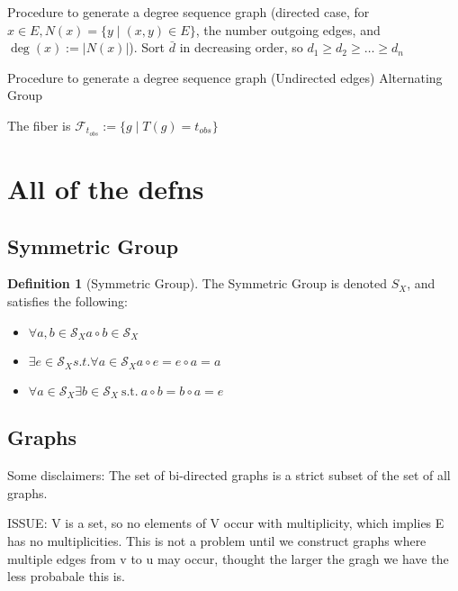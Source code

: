 \documentclass{article}
\theoremstyle{definition}
\newtheorem{definition}{Definition}
\begin{document}
Procedure to generate a degree sequence graph (directed case, for $x \in E, N(x) = \{y \mid (x,y) \in E\}$, the number outgoing edges, and $\deg(x) := |N(x)|$).
Sort $\bar{d}$ in decreasing order, so \( d_1 \geq d_2 \geq \dots \geq d_n \)

Procedure to generate a degree sequence graph (Undirected edges)
Alternating Group

The fiber is
\( \mathcal{F}_{t_{obs}} := \{ g \mid T(g) = t_{obs} \} \)


\section{All of the defns}

\subsection{Symmetric Group}
\begin{definition}[Symmetric Group] The Symmetric Group is denoted $S_X$, and satisfies the following:
\begin{itemize}
\item \( \forall a,b \in \mathcal{S}_X  a \circ b \in \mathcal{S}_X \)
\item \( \exists e \in \mathcal{S}_X s.t. \forall a \in \mathcal{S}_X a \circ e = e \circ a = a\)
\item \( \forall a \in \mathcal{S}_X \exists b \in \mathcal{S}_X \: \text{s.t.} \: a \circ b = b \circ a = e\)
\end{itemize}
\end{definition}

\subsection{Graphs}
Some disclaimers:
The set of bi-directed graphs is a strict subset of the set of all graphs. 

ISSUE: V is a set, so no elements of V occur with multiplicity, which implies E has no multiplicities. This is not a problem until we construct graphs where multiple edges from v to u may occur, thought the larger the gragh we have the less probabale this is.
\end{document}
